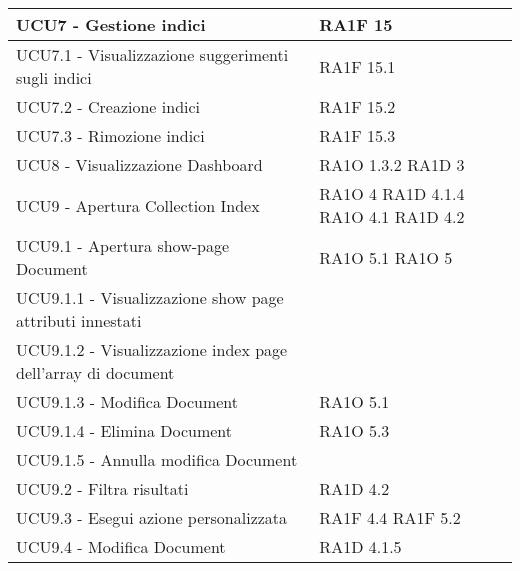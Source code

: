 \begin{center}
\begin{longtable}{ | p{5cm} | p{5cm} |}
            UCU7 - Gestione indici &  RA1F 15 \newline  \\ \hline      
            UCU7.1 - Visualizzazione suggerimenti sugli indici &  RA1F 15.1 \newline  \\ \hline      
            UCU7.2 - Creazione indici &  RA1F 15.2 \newline  \\ \hline      
            UCU7.3 - Rimozione indici &  RA1F 15.3 \newline  \\ \hline      
            UCU8 - Visualizzazione Dashboard &  RA1O 1.3.2 \newline  RA1D 3  \newline  \\ \hline      
            UCU9 - Apertura Collection Index &  RA1O 4 \newline  RA1D 4.1.4  \newline  RA1O 4.1  \newline  RA1D 4.2  \newline  \\ \hline      
            UCU9.1 - Apertura show-page Document &  RA1O 5.1 \newline  RA1O 5  \newline  \\ \hline      
            UCU9.1.1 -  Visualizzazione show page attributi innestati &  \\ \hline      
            UCU9.1.2 - Visualizzazione index page dell'array di document &  \\ \hline      
            UCU9.1.3 - Modifica Document &  RA1O 5.1 \newline  \\ \hline      
            UCU9.1.4 - Elimina Document &  RA1O 5.3 \newline  \\ \hline      
            UCU9.1.5 - Annulla modifica Document &  \\ \hline      
            UCU9.2 - Filtra risultati &  RA1D 4.2  \newline  \\ \hline      
            UCU9.3 - Esegui azione personalizzata &  RA1F 4.4 \newline  RA1F 5.2 \newline  \\ \hline      
            UCU9.4 - Modifica Document &  RA1D 4.1.5 \newline  \\ \hline      

\end{longtable}
\end{center}
